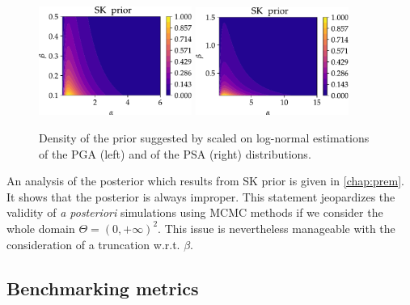             \begin{figure}[!ht]
                \centering
                {\includegraphics[width=5cm]{figures/PREM/SK_prior_PGA.pdf}}\hspace*{0.5cm}
                {\includegraphics[width=5cm]{figures/PREM/SK_prior_PSA.pdf}}                
                \caption{Density of the prior suggested by \citet{straub_improved_2008} scaled on log-normal estimations of the PGA (left) and of the PSA (right) distributions.}
                 \label{uncIM:fig:Straubprior}
            \end{figure}

            An analysis of the posterior which results from SK prior is given in \cref{chap:prem}. It shows that the posterior is always improper. This statement jeopardizes the validity of \emph{a posteriori} simulations using MCMC methods if we consider the whole domain $\Theta=(0,+\infty)^2$. This issue is nevertheless manageable with the consideration of a truncation w.r.t. $\beta$.
            
            
    \subsection{Benchmarking metrics} \label{uncIM:sec:metrics}
    
